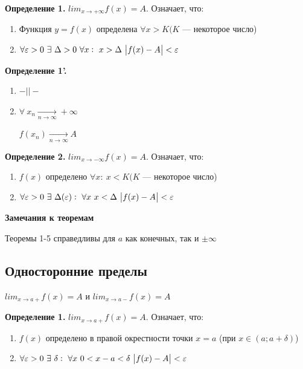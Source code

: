 \documentclass{article}
\begin{document}
  \textbf{Определение 1.} \(lim_{x \rightarrow +\infty} f(x) = A\). Означает, что:
  \begin{enumerate}
    \item Функция \(y = f(x)\) определена \(\forall x > K(K\) --- некоторое число)
    \item \(\forall \varepsilon > 0\ \exists\ \Delta > 0\ \forall x:\ x > \Delta\ \abs{f(x)-A} < \varepsilon\)
  \end{enumerate}

  \textbf{Определение 1'.} 
  \begin{enumerate}
    \item \(-||-\)
    \item \( \forall\ x_n \xrightarrow[n \rightarrow \infty]{} +\infty \)
    
    \(f(x_n) \xrightarrow[n \rightarrow \infty]{} A\)
  \end{enumerate}

  
  \textbf{Определение 2.} \(lim_{x \rightarrow -\infty} f(x) = A\). Означает, что:
  \begin{enumerate}
    \item \(f(x)\) определено \(\forall x:\ x < K(K\) --- некоторое число)
    \item \(\forall \varepsilon > 0\ \exists\ \Delta(\varepsilon):\ \forall x\ x < \Delta\ \abs{f(x)-A}<\varepsilon\)
  \end{enumerate}


  \textbf{Замечания к теоремам}
  
  Теоремы 1-5 справедливы для \(a\) как конечных, так и \(\pm\infty\)
  
  \subsection{Односторонние пределы}

  \( lim_{x \rightarrow a+} f(x) = A \) и \( lim_{x \rightarrow a-} f(x) = A \)

  \textbf{Определение 1.} \( lim_{x \rightarrow a+} f(x) = A \). Означает, что:

  \begin{enumerate}
    \item \(f(x)\) определено в правой окрестности точки \(x = a\) (при \( x \in (a; a + \delta) \))
    \item \(\forall \varepsilon > 0\ \exists\ \delta:\ \forall x\ 0 < x-a < \delta\ \abs{f(x)-A}<\varepsilon\)
  \end{enumerate}
\end{document}
